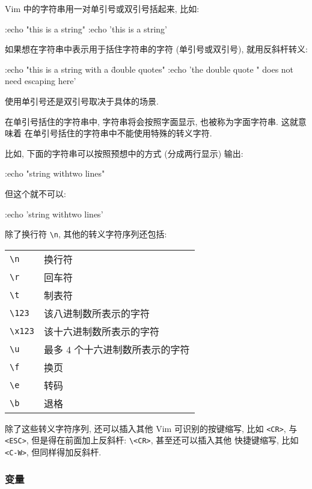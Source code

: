Vim 中的字符串用一对单引号或双引号括起来, 比如:
\begin{vimcode}
:echo "this is a string"
:echo 'this is a string'
\end{vimcode}

如果想在字符串中表示用于括住字符串的字符 (单引号或双引号), 就用反斜杆转义:
\begin{vimcode}
:echo "this is a string with a \" double quotes"
:echo 'the double quote " does not need escaping here'
\end{vimcode}

使用单引号还是双引号取决于具体的场景.

在单引号括住的字符串中, 字符串将会按照字面显示, 也被称为字面字符串. 这就意味着
在单引号括住的字符串中不能使用特殊的转义字符.

比如, 下面的字符串可以按照预想中的方式 (分成两行显示) 输出:
\begin{vimcode}
:echo "string with\n two lines"
\end{vimcode}
但这个就不可以:
\begin{vimcode}
:echo 'string with\n two lines'
\end{vimcode}

除了换行符 \verb'\n', 其他的转义字符序列还包括:

\begin{center}
\begin{tabular}{ll}
   \hline
   \verb'\n'    & 换行符 \\
   \verb'\r'    & 回车符 \\
   \verb'\t'    & 制表符 \\
   \verb'\123'  & 该八进制数所表示的字符 \\
   \verb'\x123' & 该十六进制数所表示的字符 \\
   \verb'\u'    & 最多 4 个十六进制数所表示的字符 \\
   \verb'\f'    & 换页 \\
   \verb'\e'    & 转码 \\
   \verb'\b'    & 退格 \\
   \hline
\end{tabular}
\end{center}

除了这些转义字符序列, 还可以插入其他 Vim 可识别的按键缩写, 比如 \texttt{<CR>},
与 \texttt{<ESC>}, 但是得在前面加上反斜杆: \verb'\<CR>', 甚至还可以插入其他
快捷键缩写, 比如 \texttt{<C-W>}, 但同样得加反斜杆.

\subsubsection{变量}
\label{subsubsec:variables}

